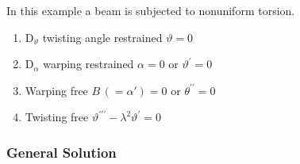 In this example a beam is subjected to nonuniform torsion. 

\begin{enumerate}
\item $\mathrm{D}_{\vartheta}$ twisting angle restrained $\vartheta=0$
\item $\mathrm{D}_{\alpha}$ warping restrained $\alpha=0$ or $\vartheta^{\prime}=0$
\item Warping free $B \,(= \alpha') =0$ or $\theta^{\prime \prime}=0$
\item Twisting free $\vartheta^{\prime \prime \prime}-\lambda^2 \vartheta^{\prime}=0$ %
\end{enumerate}

\subsubsection*{General Solution}

